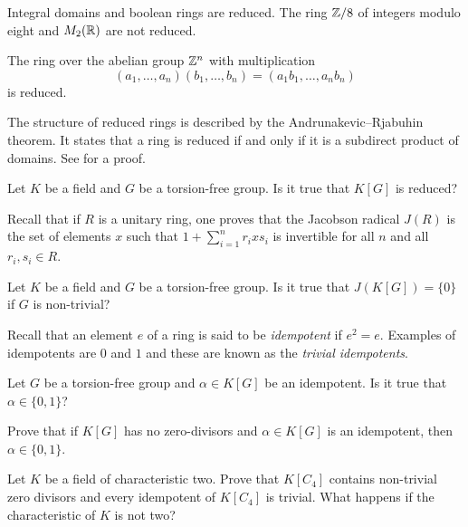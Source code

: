 Integral domains and boolean rings are reduced. The ring $\mathbb{Z}/8$ of integers
modulo eight 
and $M_2(\mathbb{R})$ are not reduced. 

\begin{example}
    The ring over the abelian group $\mathbb{Z}^n$ with multiplication  \[
    (a_1,\dots,a_n)(b_1,\dots,b_n)=(a_1b_1,\dots,a_nb_n)\]
    is reduced. 
\end{example}

The structure of 
reduced rings is described by the 
Andrunakevic--Rjabuhin theorem. It states
that a ring is reduced if and only if
it is a subdirect product of domains. See
\cite[3.20.5]{MR2015465} for a proof. 

\begin{question}
	\label{question:reduced}
	Let $K$ be a field and $G$ be a torsion-free group. Is it true that 
	$K[G]$ is reduced? 
\end{question}

Recall that if $R$ is a unitary ring, one proves that 
the Jacobson radical $J(R)$ is 
the set of elements $x$ such that
$1+\sum_{i=1}^n r_ixs_i$ is invertible 
for all $n$ and all $r_i,s_i\in R$.

\begin{question}
	\label{question:J}
	Let $K$ be a field and $G$ be a torsion-free group. Is it true that 
	$J(K[G])=\{0\}$ if $G$ is non-trivial?
\end{question}

Recall that an element $e$ of a ring is said to be \emph{idempotent} 
if $e^2=e$. Examples of idempotents are $0$ and $1$ and 
these are known as the \emph{trivial idempotents}. 

\begin{question}
	\label{question:idempotente}
	Let $G$ be a torsion-free group and $\alpha\in K[G]$ be an idempotent. 
	Is it true that $\alpha\in\{0,1\}$?
\end{question}

\begin{exercise}
	Prove that if $K[G]$ has no zero-divisors and $\alpha\in K[G]$ is an
	idempotent, then $\alpha\in\{0,1\}$.
\end{exercise}

\begin{exercise}
    Let $K$ be a field of characteristic two. 
	Prove that $K[C_4]$ contains non-trivial zero divisors and every
	idempotent of $K[C_4]$ is trivial. What happens if the characteristic of $K$ is not two?
\end{exercise}

